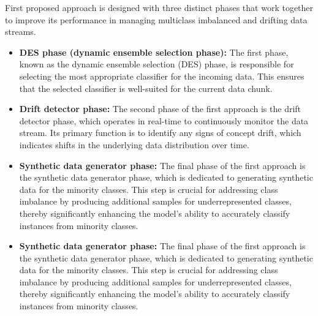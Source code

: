 First proposed approach is designed with three distinct phases that work together to improve its performance in managing multiclass imbalanced and drifting data streams. 
\begin{itemize}
	\item \textbf{DES phase (dynamic ensemble selection phase):} The first phase, known as the dynamic ensemble selection (DES) phase, is responsible for selecting the most appropriate classifier for the incoming data. This ensures that the selected classifier is well-suited for the current data chunk.
	\item \textbf{Drift detector phase:} The second phase of the first approach is the drift detector phase, which operates in real-time to continuously monitor the data stream. Its primary function is to identify any signs of concept drift, which indicates shifts in the underlying data distribution over time.
	\item \textbf{Synthetic data generator phase:} The final phase of the first approach is the synthetic data generator phase, which is dedicated to generating synthetic data for the minority classes. This step is crucial for addressing class imbalance by producing additional samples for underrepresented classes, thereby significantly enhancing the model's ability to accurately classify instances from minority classes.
	\item \textbf{Synthetic data generator phase:} The final phase of the first approach is the synthetic data generator phase, which is dedicated to generating synthetic data for the minority classes. This step is crucial for addressing class imbalance by producing additional samples for underrepresented classes, thereby significantly enhancing the model's ability to accurately classify instances from minority classes.
\end{itemize}


